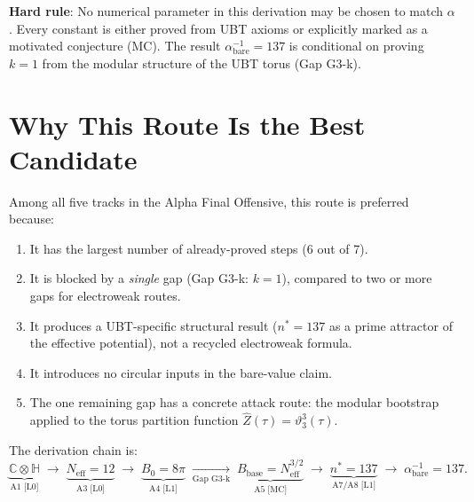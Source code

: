 \documentclass[12pt,a4paper]{article}
\theoremstyle{definition}
\theoremstyle{remark}
\begin{document}
\begin{warnbox}
\textbf{Hard rule}: No numerical parameter in this derivation may be chosen to
match $\alpha$.  Every constant is either proved from UBT axioms or
explicitly marked as a motivated conjecture (MC).  The result
$\alpha^{-1}_{\mathrm{bare}} = 137$ is conditional on proving $k = 1$ from
the modular structure of the UBT torus (Gap G3-k).
\end{warnbox}

\section{Why This Route Is the Best Candidate}
\label{sec:bc:rationale}

Among all five tracks in the Alpha Final Offensive, this route is preferred because:

\begin{enumerate}
  \item It has the largest number of already-proved steps (6 out of 7).
  \item It is blocked by a \emph{single} gap (Gap G3-k: $k = 1$),
        compared to two or more gaps for electroweak routes.
  \item It produces a UBT-specific structural result ($n^* = 137$ as a prime
        attractor of the effective potential), not a recycled electroweak formula.
  \item It introduces no circular inputs in the bare-value claim.
  \item The one remaining gap has a concrete attack route: the modular bootstrap
        applied to the torus partition function $\hat{Z}(\tau) = \vartheta_3^3(\tau)$.
\end{enumerate}

The derivation chain is:
\begin{equation}
  \underbrace{\mathbb{C}\otimes\mathbb{H}}_{\text{A1 [L0]}}
  \;\longrightarrow\;
  \underbrace{N_{\mathrm{eff}} = 12}_{\text{A3 [L0]}}
  \;\longrightarrow\;
  \underbrace{B_0 = 8\pi}_{\text{A4 [L1]}}
  \;\underset{\text{Gap G3-k}}{\longrightarrow}\;
  \underbrace{B_{\mathrm{base}} = N_{\mathrm{eff}}^{3/2}}_{\text{A5 [MC]}}
  \;\longrightarrow\;
  \underbrace{n^* = 137}_{\text{A7/A8 [L1]}}
  \;\longrightarrow\;
  \alpha^{-1}_{\mathrm{bare}} = 137.
  \label{eq:bc:chain}
\end{equation}
\end{document}
